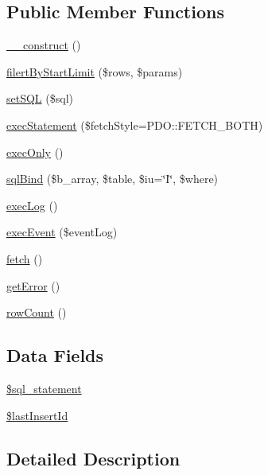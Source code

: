 \subsection*{\-Public \-Member \-Functions}
\begin{DoxyCompactItemize}
\item 
\hyperlink{classdb_helper_a095c5d389db211932136b53f25f39685}{\-\_\-\-\_\-construct} ()
\item 
\hyperlink{classdb_helper_afab91f6d05df61aa06e6bfc035b13afe}{filert\-By\-Start\-Limit} (\$rows, \$params)
\item 
\hyperlink{classdb_helper_a21e387f778abae898a33b0355e56c095}{set\-S\-Q\-L} (\$sql)
\item 
\hyperlink{classdb_helper_a43a2fa1fe095e37df5a641fe1cfc7d9c}{exec\-Statement} (\$fetch\-Style=\-P\-D\-O\-::\-F\-E\-T\-C\-H\-\_\-\-B\-O\-T\-H)
\item 
\hyperlink{classdb_helper_ae033db35138ae80f3b1fd33c5c2c473e}{exec\-Only} ()
\item 
\hyperlink{classdb_helper_aa9840bbfb81d2d519994cd0a8e880c4a}{sql\-Bind} (\$b\-\_\-array, \$table, \$iu=\char`\"{}\-I\char`\"{}, \$where)
\item 
\hyperlink{classdb_helper_a75dea4073687142b0b1b6a6819cbb243}{exec\-Log} ()
\item 
\hyperlink{classdb_helper_ac1876160b600b359a60fd5aad7edba09}{exec\-Event} (\$event\-Log)
\item 
\hyperlink{classdb_helper_ae48cc10bd727774bb36203986ce3b176}{fetch} ()
\item 
\hyperlink{classdb_helper_a24ada5decce3d1b79cd82f5a90ccf404}{get\-Error} ()
\item 
\hyperlink{classdb_helper_a82b073888555fc72e57142fe913db377}{row\-Count} ()
\end{DoxyCompactItemize}
\subsection*{\-Data \-Fields}
\begin{DoxyCompactItemize}
\item 
\hyperlink{classdb_helper_a29c1e591b4e284bca5ae38ed00eea5a9}{\$sql\-\_\-statement}
\item 
\hyperlink{classdb_helper_ae4ac788f919cb92f528ab1455e8a3e6b}{\$last\-Insert\-Id}
\end{DoxyCompactItemize}


\subsection{\-Detailed \-Description}


